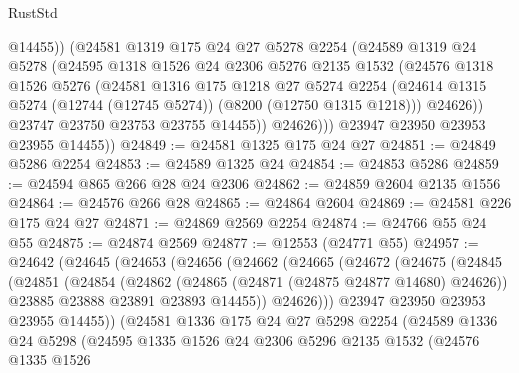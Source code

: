 \begin{lexlean}{RustStd}
\begin{coremodule}
                @14455))
            (@24581
              @1319
              @175
              @24
              @27
              @5278
              @2254
              (@24589
                @1319
                @24
                @5278
                (@24595
                  @1318
                  @1526
                  @24
                  @2306
                  @5276
                  @2135
                  @1532
                  (@24576
                    @1318
                    @1526
                    @5276
                    (@24581
                      @1316
                      @175
                      @1218
                      @27
                      @5274
                      @2254
                      (@24614 @1315 @5274 (@12744 (@12745 @5274)) (@8200 (@12750 @1315 @1218)))
                      @24626))
                  @23747
                  @23750
                  @23753
                  @23755
                  @14455))
              @24626)))
        @23947
        @23950
        @23953
        @23955
        @14455))
@24849 := @24581 @1325 @175 @24 @27
@24851 := @24849 @5286 @2254
@24853 := @24589 @1325 @24
@24854 := @24853 @5286
@24859 := @24594 @865 @266 @28 @24 @2306
@24862 := @24859 @2604 @2135 @1556
@24864 := @24576 @266 @28
@24865 := @24864 @2604
@24869 := @24581 @226 @175 @24 @27
@24871 := @24869 @2569 @2254
@24874 := @24766 @55 @24 @55
@24875 := @24874 @2569
@24877 := @12553 (@24771 @55)
@24957 := @24642
    (@24645
      (@24653
        (@24656
          (@24662
            (@24665
              (@24672
                (@24675
                  (@24845
                    (@24851
                      (@24854
                        (@24862
                          (@24865 (@24871 (@24875 @24877 @14680) @24626))
                          @23885
                          @23888
                          @23891
                          @23893
                          @14455))
                      @24626)))
                @23947
                @23950
                @23953
                @23955
                @14455))
            (@24581
              @1336
              @175
              @24
              @27
              @5298
              @2254
              (@24589
                @1336
                @24
                @5298
                (@24595
                  @1335
                  @1526
                  @24
                  @2306
                  @5296
                  @2135
                  @1532
                  (@24576
                    @1335
                    @1526

\end{coremodule}
\end{lexlean}
